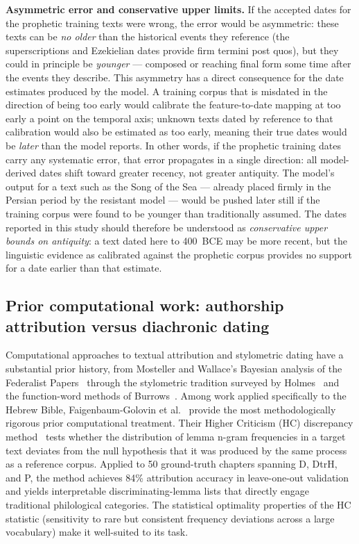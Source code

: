 \documentclass[10pt,letterpaper]{article}
\begin{document}
\textbf{Asymmetric error and conservative upper limits.}
If the accepted dates for the prophetic training texts were wrong, the
error would be asymmetric: these texts can be \emph{no older} than the
historical events they reference (the superscriptions and Ezekielian dates
provide firm termini post quos), but they could in principle be
\emph{younger} --- composed or reaching final form some time after the
events they describe.  This asymmetry has a direct consequence for the
date estimates produced by the model.  A training corpus that is misdated
in the direction of being too early would calibrate the feature-to-date
mapping at too early a point on the temporal axis; unknown texts dated
by reference to that calibration would also be estimated as too early,
meaning their true dates would be \emph{later} than the model reports.
In other words, if the prophetic training dates carry any systematic error,
that error propagates in a single direction: all model-derived dates shift
toward greater recency, not greater antiquity.  The model's output for a
text such as the Song of the Sea --- already placed firmly in the Persian
period by the resistant model --- would be pushed later still if the
training corpus were found to be younger than traditionally assumed.  The
dates reported in this study should therefore be understood as
\emph{conservative upper bounds on antiquity}: a text dated here to
400~BCE may be more recent, but the linguistic evidence as calibrated
against the prophetic corpus provides no support for a date earlier than
that estimate.

\subsection*{Prior computational work: authorship attribution versus
diachronic dating}

Computational approaches to textual attribution and stylometric dating have a substantial prior history, from Mosteller and Wallace's Bayesian analysis of the Federalist Papers~\cite{Mosteller1984} through the stylometric tradition surveyed by Holmes~\cite{Holmes1998} and the function-word methods of Burrows~\cite{Burrows2002}.  Among work applied specifically to the Hebrew Bible, Faigenbaum-Golovin et al.~\cite{Faigenbaum2025} provide the most
methodologically rigorous prior computational treatment.
Their Higher Criticism (HC) discrepancy method~\cite{Faigenbaum2025} tests
whether the distribution of lemma n-gram frequencies in a target text
deviates from the null hypothesis that it was produced by the same process
as a reference corpus.  Applied to 50 ground-truth chapters spanning D,
DtrH, and P, the method achieves 84\% attribution accuracy in leave-one-out
validation and yields interpretable discriminating-lemma lists that directly
engage traditional philological categories.  The statistical
optimality properties of the HC statistic (sensitivity to rare but
consistent frequency deviations across a large vocabulary) make it
well-suited to its task.
\end{document}
